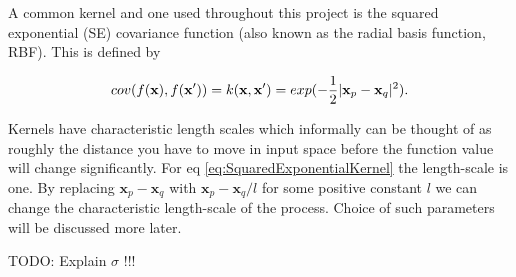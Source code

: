 \documentclass[12pt,a4paper]{report}
\theoremstyle{definition}
\begin{document}
A common kernel and one used throughout this project is the squared exponential (SE) covariance function (also known as the radial basis function, RBF). 
This is defined by

\begin{equation}
	\centering
	cov(f(\textbf{x}), f(\textbf{x}')) = k(\textbf{x}, \textbf{x}') = exp(-\frac{1}{2} |\textbf{x}_{p} - \textbf{x}_{q}|^2).
	\label{eq:SquaredExponentialKernel}
\end{equation}

Kernels have characteristic length scales which informally can be thought of as roughly the distance you have to move in input space before the function value will change significantly. 
For eq \ref{eq:SquaredExponentialKernel} the length-scale is one. 
By replacing $\textbf{x}_{p} - \textbf{x}_{q}$ with $\textbf{x}_{p} - \textbf{x}_{q} / l$ for some positive constant $l$ we can change the characteristic length-scale of the process.
Choice of such parameters will be discussed more later.

TODO: Explain $\sigma$ !!!
\end{document}
